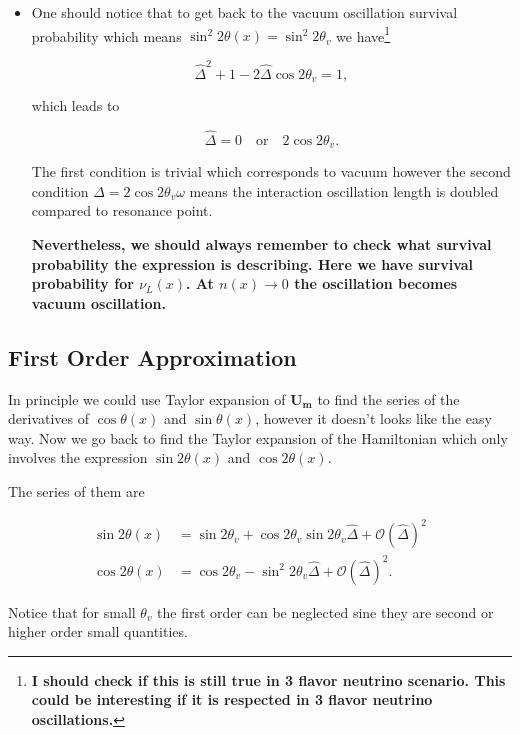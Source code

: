 \documentclass{tufte-handout}
\begin{document}
\begin{itemize}
\item
One should notice that to get back to the vacuum oscillation survival probability which means $\sin^2 2\theta(x) = \sin^2 2\theta_v $ we have\footnote{\bf I should check if this is still true in 3 flavor neutrino scenario. This could be interesting if it is respected in 3 flavor neutrino oscillations.}

\begin{equation*}
\hat\Delta^2 + 1 - 2\hat\Delta \cos 2\theta_v = 1,
\end{equation*}

which leads to

\begin{equation*}
\hat\Delta = 0 \quad\text{or}\quad 2\cos 2\theta_v .
\end{equation*}

The first condition is trivial which corresponds to vacuum however the second condition $\Delta = 2\cos 2\theta_v \omega$ means the interaction oscillation length is doubled compared to resonance point.

{\bf{Nevertheless, we should always remember to check what survival probability the expression is describing. Here we have survival probability for $\nu_L(x)$. At $n(x)\to 0$ the oscillation becomes vacuum oscillation.}}

\end{itemize}




\subsection{First Order Approximation}


In principle we could use Taylor expansion of $\mathbf{U_m}$ to find the series of the derivatives of $\cos\theta(x)$ and $\sin\theta(x)$, however it doesn't looks like the easy way. Now we go back to find the Taylor expansion of the Hamiltonian which only involves the expression $\sin 2\theta(x)$ and $\cos 2\theta(x)$.

The series of them are

\begin{align*}
\sin 2\theta(x) & = \sin 2\theta_v + \cos 2\theta_v \sin 2\theta_v \hat\Delta + \mathcal{O}(\hat\Delta)^2 \\
\cos 2\theta(x) & = \cos 2\theta_v -\sin^2 2\theta_v \hat \Delta + \mathcal{O}(\hat\Delta)^2 .
\end{align*}

Notice that for small $\theta_v$ the first order can be neglected sine they are second or higher order small quantities.
\end{document}
